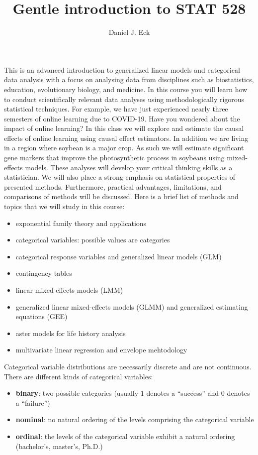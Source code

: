 \documentclass[12pt]{article}
\title{Gentle introduction to STAT 528}
\author{Daniel J. Eck}
\date{}
\begin{document}
\maketitle

This is an advanced introduction to generalized linear models and categorical data analysis with a focus on analysing data from disciplines such as biostatistics, education, evolutionary biology, and medicine. In this course you will learn how to conduct scientifically relevant data analyses using methodologically rigorous statistical techniques. For example, we have just experienced nearly three semesters of online learning due to COVID-19. Have you wondered about the impact of online learning? In this class we will explore and estimate the causal effects of online learning using causal effect estimators. In addition we are living in a region where soybean is a major crop. As such we will estimate significant gene markers that improve the photosynthetic process in soybeans using mixed-effects models. These analyses will develop your critical thinking skills as a statistician. We will also place a strong emphasis on statistical properties of presented methods. Furthermore, practical advantages, limitations, and comparisons of methods will be discussed. Here is a brief list of methods and topics that we will study in this course:  
\begin{itemize}
	\item exponential family theory and applications 
	\item categorical variables: possible values are categories 
	\item categorical response variables and generalized linear models (GLM)
    \item contingency tables 
	\item linear mixed effects models (LMM)
	\item generalized linear mixed-effects models (GLMM) and generalized estimating equations (GEE)
	\item aster models for life history analysis 
	\item multivariate linear regression and envelope mehtodology
\end{itemize}

\noindent Categorical variable distributions are necessarily discrete and are not continuous. There are different kinds of categorical variables:
\begin{itemize}
	\item \textbf{binary}: two possible categories (usually 1 denotes a ``success'' and 0 denotes a ``failure'')
	\item \textbf{nominal}: no natural ordering of the levels comprising the categorical variable
	\item \textbf{ordinal}: the levels of the categorical variable exhibit a natural ordering (bachelor's, master's, Ph.D.)
\end{itemize}
\end{document}
